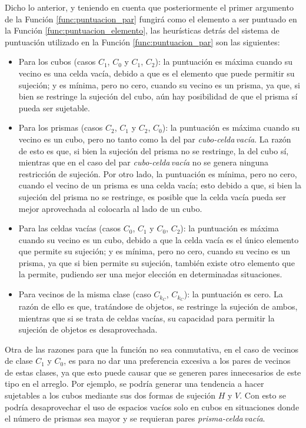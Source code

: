 Dicho lo anterior, y teniendo en cuenta que posteriormente el primer argumento de la Función \ref{func:puntuacion_par} fungirá como el elemento a ser puntuado en la Función \ref{func:puntuacion_elemento}, las heurísticas detrás del sistema de puntuación utilizado en la Función \ref{func:puntuacion_par} son las siguientes:
%
\begin{itemize}
	\item Para los cubos (casos $C_1$, $C_0$ y $C_1$, $C_2$): la puntuación es máxima cuando su vecino es una celda vacía, debido a que es el elemento que puede permitir su sujeción; y es mínima, pero no cero, cuando su vecino es un prisma, ya que, si bien se restringe la sujeción del cubo, aún hay posibilidad de que el prisma sí pueda ser sujetable.
	\item Para los prismas (casos $C_2$, $C_1$ y $C_2$, $C_0$): la puntuación es máxima cuando su vecino es un cubo, pero no tanto como la del par \textsl{cubo-celda\,vacía}.
	La razón de esto es que, si bien la sujeción del prisma no se restringe, la del cubo sí, mientras que en el caso del par \textsl{cubo-celda\,vacía} no se genera ninguna restricción de sujeción.
	Por otro lado, la puntuación es mínima, pero no cero, cuando el vecino de un prisma es una celda vacía; esto debido a que, si bien la sujeción del prisma no se restringe, es posible que la celda vacía pueda ser mejor aprovechada al colocarla al lado de un cubo.
	\item Para las celdas vacías (casos $C_0$, $C_1$ y $C_0$, $C_2$): la puntuación es máxima cuando su vecino es un cubo, debido a que la celda vacía es el único elemento que permite su sujeción; y es mínima, pero no cero, cuando su vecino es un prisma, ya que si bien permite su sujeción, también existe otro elemento que la permite, pudiendo ser una mejor elección en determinadas situaciones.
	\item Para vecinos de la misma clase (caso $C_{k_C}$, $C_{k_C}$): la puntuación es cero.
	 La razón de ello es que, tratándose de objetos, se restringe la sujeción de ambos, mientras que si se trata de celdas vacías, su capacidad para permitir la sujeción de objetos es desaprovechada.
\end{itemize}
%
Otra de las razones para que la función no sea conmutativa, en el caso de vecinos de clase $C_1$ y $C_0$, es para no dar una preferencia excesiva a los pares de vecinos de estas clases, ya que esto puede causar que se generen pares innecesarios de este tipo en el arreglo.
Por ejemplo, se podría generar una tendencia a hacer sujetables a los cubos mediante sus dos formas de sujeción $H$ y $V$.
Con esto se podría desaprovechar el uso de espacios vacíos solo en cubos en situaciones donde el número de prismas sea mayor y se requieran pares \textsl{prisma-celda\,vacía}.

